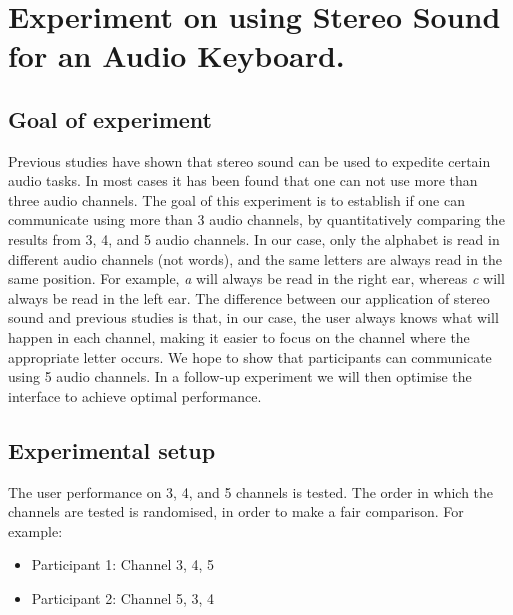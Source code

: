 \documentclass[10pt,fleqn,a4paper]{article}
\begin{document}
 

 \title{  }
\author{}
\date{} 
\maketitle


\setlength{\parindent}{0ex} \setlength{\parskip}{2.0ex plus 1.0ex minus 0.5ex} \setlength{\parskip}{12pt}
\setlength{\baselineskip}{12pt}

\section{Experiment on using Stereo Sound for an Audio Keyboard.}

\subsection{Goal of experiment}
 

Previous studies have shown that stereo sound can be used to expedite certain audio tasks. In most cases it has been found that one can not use more than three audio channels. 
The goal of this experiment is to establish if one can communicate using more than 3 audio channels, by quantitatively comparing the results from  3, 4, and 5 audio channels. In our case, only 
the alphabet is read in different audio channels (not words), and the same letters are always read in the same position. For example, {\em a} will always be read in the right ear, 
whereas {\em c} will always be read in the left ear. The difference between our application of stereo sound and previous studies is that, in our case, the user always knows what will happen
in each channel, making it easier to focus on the channel where the appropriate letter occurs. We hope to show that participants can communicate using 5 audio channels. 
In a follow-up experiment we will then optimise the interface to achieve optimal performance.

\subsection{Experimental setup} 

The user performance on 3, 4, and 5 channels is tested. The order in which the channels are tested is randomised, in order to make a fair comparison. For example:
\begin{itemize}
\item Participant 1: Channel 3, 4, 5
\item Participant 2: Channel 5, 3, 4
\end{itemize}
\end{document}
